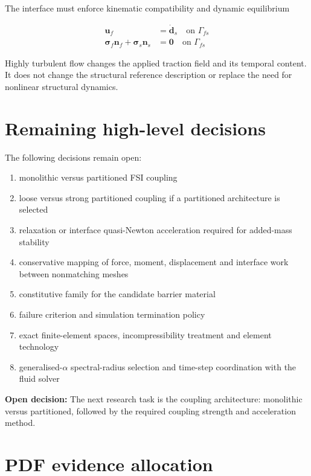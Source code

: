 \documentclass[11pt,a4paper]{article}
\newcommand{\openitem}[1]{\textbf{Open decision:} #1}
\begin{document}
The interface must enforce kinematic compatibility and dynamic equilibrium

\begin{align}
\bm{u}_{f}
&=
\dot{\bm{d}}_{s}
\quad \text{on }\Gamma_{fs}
\label{eq:interface-kinematic}
\\
\bm{\sigma}_{f}\bm{n}_{f}
+\bm{\sigma}_{s}\bm{n}_{s}
&=
\bm{0}
\quad \text{on }\Gamma_{fs}
\label{eq:interface-dynamic}
\end{align}

Highly turbulent flow changes the applied traction field and its temporal content. It does not change the structural reference description or replace the need for nonlinear structural dynamics.

\section{Remaining high-level decisions}
\label{sec:remaining-decisions}

The following decisions remain open:

\begin{enumerate}[label=\arabic*.]
  \item monolithic versus partitioned FSI coupling
  \item loose versus strong partitioned coupling if a partitioned architecture is selected
  \item relaxation or interface quasi-Newton acceleration required for added-mass stability
  \item conservative mapping of force, moment, displacement and interface work between nonmatching meshes
  \item constitutive family for the candidate barrier material
  \item failure criterion and simulation termination policy
  \item exact finite-element spaces, incompressibility treatment and element technology
  \item generalised-\(\alpha\) spectral-radius selection and time-step coordination with the fluid solver
\end{enumerate}

\openitem{The next research task is the coupling architecture: monolithic versus partitioned, followed by the required coupling strength and acceleration method.}

\section{PDF evidence allocation}
\label{sec:pdf-allocation}
\end{document}
